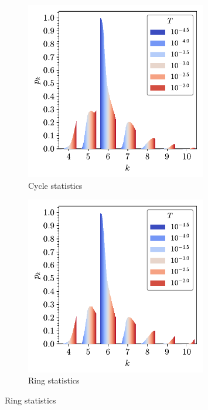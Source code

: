 \begin{figure}[tb]
	\centering
     
     \begin{subfigure}[b]{0.48\textwidth}
         \centering
         \includegraphics[width=0.87\textwidth]{./figures/ph/tr_pk_ph.pdf}
         \caption{Cycle statistics}
         \label{fig:trpkpha}
     \end{subfigure}
     \hfill
     \begin{subfigure}[b]{0.48\textwidth}
         \centering
         \includegraphics[width=0.87\textwidth]{./figures/ph/tr_pk_true.pdf}
         \caption{Ring statistics}
         \label{fig:trpkphb}
     \end{subfigure}


\end{figure}
